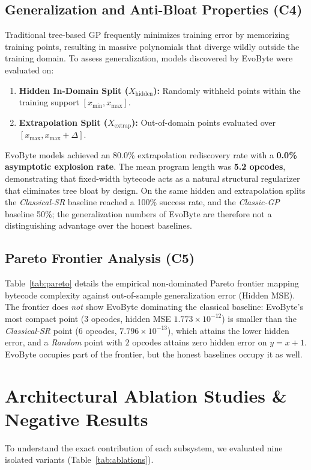 \documentclass[11pt,a4paper]{article}
\begin{document}
\subsection{Generalization and Anti-Bloat Properties (C4)}
Traditional tree-based GP frequently minimizes training error by memorizing training points, resulting in massive polynomials that diverge wildly outside the training domain. To assess generalization, models discovered by EvoByte were evaluated on:
\begin{enumerate}
    \item \textbf{Hidden In-Domain Split ($X_{\text{hidden}}$):} Randomly withheld points within the training support $[x_{\min}, x_{\max}]$.
    \item \textbf{Extrapolation Split ($X_{\text{extrap}}$):} Out-of-domain points evaluated over $[x_{\max}, x_{\max} + \Delta]$.
\end{enumerate}
EvoByte models achieved an 80.0\% extrapolation rediscovery rate with a \textbf{0.0\% asymptotic explosion rate}. The mean program length was \textbf{5.2 opcodes}, demonstrating that fixed-width bytecode acts as a natural structural regularizer that eliminates tree bloat by design. On the same hidden and extrapolation splits the \emph{Classical-SR} baseline reached a 100\% success rate, and the \emph{Classic-GP} baseline 50\%; the generalization numbers of EvoByte are therefore not a distinguishing advantage over the honest baselines.



\subsection{Pareto Frontier Analysis (C5)}
Table~\ref{tab:pareto} details the empirical non-dominated Pareto frontier mapping bytecode complexity against out-of-sample generalization error (Hidden MSE). The frontier does \emph{not} show EvoByte dominating the classical baseline: EvoByte's most compact point ($3$ opcodes, hidden MSE $1.773\times 10^{-12}$) is smaller than the \emph{Classical-SR} point ($6$ opcodes, $7.796\times 10^{-13}$), which attains the lower hidden error, and a \emph{Random} point with $2$ opcodes attains zero hidden error on $y = x+1$. EvoByte occupies part of the frontier, but the honest baselines occupy it as well.

\section{Architectural Ablation Studies \& Negative Results}
To understand the exact contribution of each subsystem, we evaluated nine isolated variants (Table~\ref{tab:ablations}).
\end{document}
